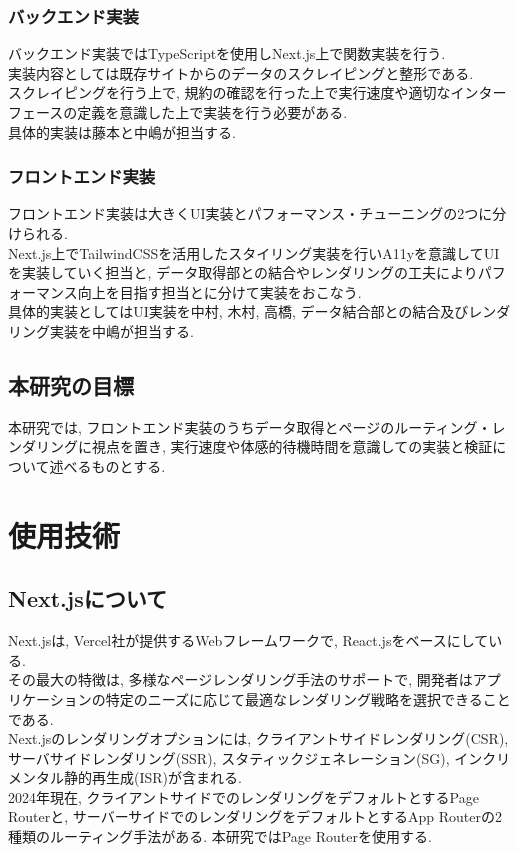 \subsubsection{バックエンド実装}
バックエンド実装ではTypeScriptを使用しNext.js上で関数実装を行う. \\
実装内容としては既存サイトからのデータのスクレイピングと整形である. \\
スクレイピングを行う上で, 規約の確認を行った上で実行速度や適切なインターフェースの定義を意識した上で実装を行う必要がある.\\
具体的実装は藤本と中嶋が担当する.

\subsubsection{フロントエンド実装}
フロントエンド実装は大きくUI実装とパフォーマンス・チューニングの2つに分けられる.\\
Next.js上でTailwindCSSを活用したスタイリング実装を行いA11yを意識してUIを実装していく担当と, データ取得部との結合やレンダリングの工夫によりパフォーマンス向上を目指す担当とに分けて実装をおこなう.\\
具体的実装としてはUI実装を中村, 木村, 高橋, データ結合部との結合及びレンダリング実装を中嶋が担当する.

\subsection{本研究の目標}
本研究では, フロントエンド実装のうちデータ取得とページのルーティング・レンダリングに視点を置き, 実行速度や体感的待機時間を意識しての実装と検証について述べるものとする. 

\section{使用技術}
\subsection{Next.jsについて}
Next.jsは, Vercel社が提供するWebフレームワークで, React.jsをベースにしている. \\
その最大の特徴は, 多様なページレンダリング手法のサポートで, 開発者はアプリケーションの特定のニーズに応じて最適なレンダリング戦略を選択できることである.\cite{no5} \\
Next.jsのレンダリングオプションには, クライアントサイドレンダリング(CSR), サーバサイドレンダリング(SSR), スタティックジェネレーション(SG), インクリメンタル静的再生成(ISR)が含まれる. \\
2024年現在, クライアントサイドでのレンダリングをデフォルトとするPage Routerと, サーバーサイドでのレンダリングをデフォルトとするApp Routerの2種類のルーティング手法がある. 本研究ではPage Routerを使用する. 

